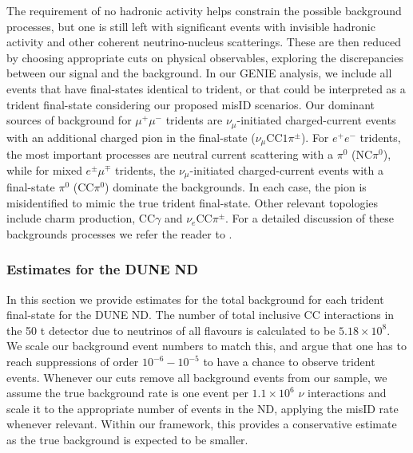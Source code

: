 The requirement of no hadronic activity helps constrain the possible background processes, but one is still left with significant events with invisible hadronic activity and other coherent neutrino-nucleus scatterings. These are then reduced by choosing appropriate cuts on physical observables, exploring the discrepancies between our signal and the background. In our GENIE analysis, we include all events that have final-states identical to trident, or that could be interpreted as a trident final-state considering our proposed misID scenarios. Our dominant sources of background for $\mu^+ \mu^-$ tridents are $\nu_\mu$-initiated charged-current events with an additional charged pion in the final-state ($\nu_\mu$CC$1\pi^\pm$). For $e^+e^-$ tridents, the most important processes are neutral current scattering with a $\pi^0$ (NC$\pi^0$), while for mixed $e^\pm \mu^\mp$ tridents, the $\nu_\mu$-initiated charged-current events with a final-state $\pi^0$ (CC$\pi^0$) dominate the backgrounds. In each case, the pion is misidentified to mimic the true trident final-state. Other relevant topologies include charm production, CC$\gamma$ and $\nu_e$CC$\pi^\pm$. For a detailed discussion of these backgrounds processes we refer the reader to .

\subsubsection{\label{sec:DUNE_bg_rates}Estimates for the DUNE ND}

In this section we provide estimates for the total background for each trident final-state for the DUNE ND. The number of total inclusive CC interactions in the 50 t detector due to neutrinos of all flavours is calculated to be $5.18 \times 10^8$. We scale our background event numbers to match this, and argue that one has to reach suppressions of order $10^{-6} - 10^{-5}$ to have a chance to observe trident events. Whenever our cuts remove all background events from our sample, we assume the true background rate is one event per $1.1\times10^6$ $\nu$ interactions and scale it to the appropriate number of events in the ND, applying the misID rate whenever relevant. Within our framework, this provides a conservative estimate as the true background is expected to be smaller.

